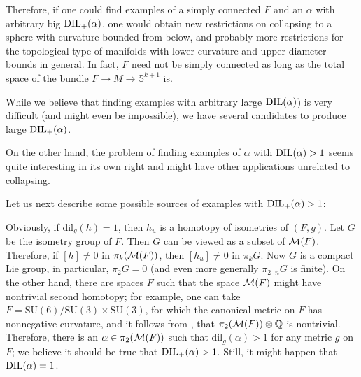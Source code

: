 \documentclass{amsart}
\begin{document}
Therefore, if one could find examples of a simply connected $F$ and an $\alpha$ with arbitrary big $\operatorname{\rm DIL}_+(\alpha)$, one would obtain new restrictions on collapsing to a sphere with curvature bounded from below, and probably more restrictions for the topological type of manifolds with lower curvature and upper diameter bounds in general.
In fact, $F$ need not be simply connected as long as the total space of the bundle $F\to M\to \mathbb{S}^{k+1}$ is.

While we believe that finding examples with arbitrary large  $\operatorname{\rm DIL}(\alpha)$) is very difficult
(and might even be impossible), we have several candidates to produce large $\operatorname{\rm DIL}_+(\alpha)$.

On the other hand, the problem of finding examples of $\alpha$ with
$\operatorname{\rm DIL}(\alpha)>1$
seems quite interesting in its own right and might have other applications unrelated to collapsing.

\medskip

Let us next describe  some possible sources of  examples with
$\operatorname{\rm DIL}_+(\alpha)>1$:

\begin{ex}
Obviously, if dil$_g(h)=1$, then $h_u$ is a homotopy of isometries of $(F,g)$.
Let $G$ be the isometry group of $F$.
Then $G$ can be viewed as a subset of ${\mathcal M}(F)$.
Therefore, if $[h]\not= 0$ in $\pi_k({\mathcal M}(F))$, then $[h_u]\not=0$ in $\pi_kG$.
Now $G$ is a compact Lie group, in particular, $\pi_2G=0$
(and even more generally $\pi_{2{\cdot} n}G$ is finite).
On the other hand, there are spaces $F$ such that the space ${\mathcal M}(F)$ might have nontrivial second homotopy;
for example, one can take  $F=\mathrm{SU}(6)/\mathrm{SU}(3)\times \mathrm{SU}(3)$,
for which the canonical metric on $F$ has nonnegative curvature,
and it follows
from  \cite[Chapter 5, Example 4.14]{OT},
that
$\pi_2({\mathcal M}(F))\otimes \mathbb{Q}$ is nontrivial.
Therefore, there is  an $\alpha \in \pi_2({\mathcal M}(F))$ such that
dil$_g(\alpha)>1$ for any metric $g $ on $F$;
we believe it should be true that $\operatorname{\rm DIL}_+(\alpha)>1$.
Still, it might happen that $\operatorname{\rm DIL}(\alpha)=1$.
\end{ex}
\end{document}
